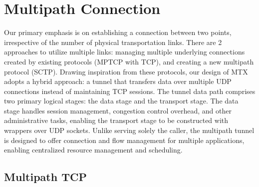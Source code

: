 \section{Multipath Connection}\label{sec:related_work:mp_connection}
Our primary emphasis is on establishing a connection between two points, irrespective of the number of physical transportation links.
There are 2 approaches to utilize multiple links: managing multiple underlying connections created by existing protocols (\ac{MPTCP} with TCP), and creating a new multipath protocol (\ac{SCTP}).
Drawing inspiration from these protocols, our design of \ac{MTX} adopts a hybrid approach: a tunnel that transfers data over multiple UDP connections instead of maintaining TCP sessions. 
The tunnel data path comprises two primary logical stages: the data stage and the transport stage. 
The data stage handles session management, congestion control overhead, and other administrative tasks, enabling the transport stage to be constructed with wrappers over UDP sockets.
Unlike serving solely the caller, the multipath tunnel is designed to offer connection and flow management for multiple applications, enabling centralized resource management and scheduling.

\subsection{Multipath TCP}\label{sec:related_work:mp_connection:MPTCP}

